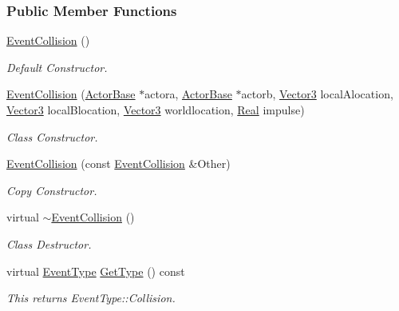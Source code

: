 \subsubsection*{Public Member Functions}
\begin{DoxyCompactItemize}
\item 
\hypertarget{classphys_1_1EventCollision_af44ef170326f56879e9e4608984a4196}{
\hyperlink{classphys_1_1EventCollision_af44ef170326f56879e9e4608984a4196}{EventCollision} ()}
\label{dd/de9/classphys_1_1EventCollision_af44ef170326f56879e9e4608984a4196}

\begin{DoxyCompactList}\small\item\em Default Constructor. \item\end{DoxyCompactList}\item 
\hyperlink{classphys_1_1EventCollision_a0f5a0862cde3b7db4482be6984434742}{EventCollision} (\hyperlink{classphys_1_1ActorBase}{ActorBase} $\ast$actora, \hyperlink{classphys_1_1ActorBase}{ActorBase} $\ast$actorb, \hyperlink{classphys_1_1Vector3}{Vector3} localAlocation, \hyperlink{classphys_1_1Vector3}{Vector3} localBlocation, \hyperlink{classphys_1_1Vector3}{Vector3} worldlocation, \hyperlink{namespacephys_af7eb897198d265b8e868f45240230d5f}{Real} impulse)
\begin{DoxyCompactList}\small\item\em Class Constructor. \item\end{DoxyCompactList}\item 
\hyperlink{classphys_1_1EventCollision_a85c999154866380d232ddcdfd9534c85}{EventCollision} (const \hyperlink{classphys_1_1EventCollision}{EventCollision} \&Other)
\begin{DoxyCompactList}\small\item\em Copy Constructor. \item\end{DoxyCompactList}\item 
virtual \hyperlink{classphys_1_1EventCollision_afcbf057fc955ce6c05b21c08325b1822}{$\sim$EventCollision} ()
\begin{DoxyCompactList}\small\item\em Class Destructor. \item\end{DoxyCompactList}\item 
virtual \hyperlink{classphys_1_1EventBase_a5e6a8564e127f654123f0bf6a2751923}{EventType} \hyperlink{classphys_1_1EventCollision_a96c2809f1bbab78b9f2758cea15a9a36}{GetType} () const 
\begin{DoxyCompactList}\small\item\em This returns EventType::Collision. \item\end{DoxyCompactList}\end{DoxyCompactItemize}

